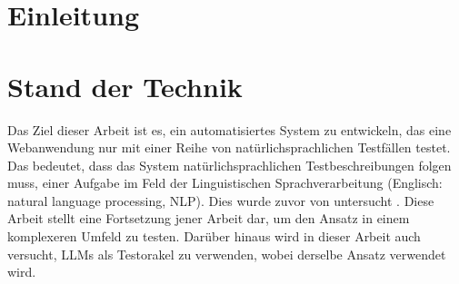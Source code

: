
\chapter{Einleitung}
\label{ch:Introduction}


\chapter{Stand der Technik}
\label{ch:RelatedWork}

Das Ziel dieser Arbeit ist es, ein automatisiertes System zu entwickeln, das eine Webanwendung nur mit einer Reihe von natürlichsprachlichen Testfällen testet.
Das bedeutet, dass das System natürlichsprachlichen Testbeschreibungen folgen muss, einer Aufgabe im Feld der Linguistischen Sprachverarbeitung (Englisch: natural language processing, NLP).
Dies wurde zuvor von  untersucht \cite{GPT3Testing}.
Diese Arbeit stellt eine Fortsetzung jener Arbeit dar, um den Ansatz in einem komplexeren Umfeld zu testen.
Darüber hinaus wird in dieser Arbeit auch versucht, LLMs als Testorakel zu verwenden, wobei derselbe Ansatz verwendet wird.

